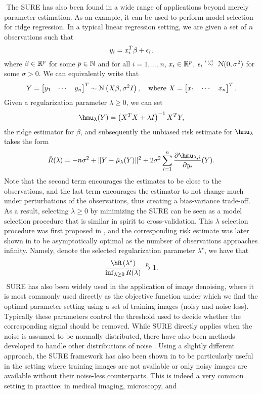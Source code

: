 $ $\newline
The SURE has also been found in a wide range of applications beyond merely parameter estimation. As an example, it can be used to perform model selection for ridge regression. In a typical linear regression setting, we are given a set of $n$ observations such that
\[
y_i = x_i^T\beta + \epsilon_i,
\]
where $\beta\in\mathbb{R}^p$ for some $p\in\mathbb{N}$ and for all $i=1,\dots,n$, $x_i\in\mathbb{R}^p$, $\epsilon_i\overset{\textrm{\tiny i.i.d.\ }}{\sim} \mathcal{N}(0,\sigma^2)$ for some $\sigma>0$. We can equivalently write that
\[
Y = \begin{bmatrix} y_1 & \cdots & y_n \end{bmatrix}^T \sim \mathcal{N}\left(X\beta, \sigma^2I \right), \quad \text{where } X = \begin{bmatrix} x_1 & \cdots & x_n \end{bmatrix}^T.
\]
Given a regularization parameter $\lambda\geq0$, we can set
\[
\hmu_\lambda(Y) = \left( X^TX + \lambda I \right)^{-1}X^TY,
\]
the ridge estimator for $\beta$, and subsequently the unbiased risk estimate for $\hmu_\lambda$ takes the form
\[
\hat{R}(\lambda) = -n\sigma^2 + \| Y - \hat{\mu}_\lambda(Y) \|^2 + 2\sigma^2\sum_{i=1}^n \frac{\partial \hmu_{\lambda,i}}{\partial y_i}(Y).
\]
Note that the second term encourages the estimates to be close to the observations, and the last term encourages the estimator to not change much under perturbations of the observations, thus creating a bias-variance trade-off. As a result, selecting $\lambda\geq0$ by minimizing the SURE can be seen as a model selection procedure that is similar in spirit to cross-validation. This $\lambda$ selection procedure was first proposed in \citet{10.2307/1267380}, and the corresponding risk estimate was later shown in \citet{li1986asymptotic} to be asymptotically optimal as the numbser of observations approaches infinity. Namely, denote the selected regularization parameter $\lambda^\star$, we have that
\[
\frac{\hR\left(\lambda^\star\right)}{\inf_{\lambda\geq0}R(\lambda)} \convp 1.
\]
$ $\newline
SURE has also been widely used in the application of image denoising, where it is most commonly used directly as the objective function under which we find the optimal parameter setting using a set of training images (noisy and noise-less). Typically these parameters control the threshold used to decide whether the corresponding signal should be removed. While SURE directly applies when the noise is assumed to be normally distributed, there have also been methods developed to handle other distributions of noise \citep{donoho1995adapting,luisier2010image,panisetti2014unbiased}. Using a slightly different approach, the SURE framework has also been shown in \citet{metzler2018unsupervised} to be particularly useful in the setting where training images are not available or only noisy images are available without their noise-less counterparts. This is indeed a very common setting in practice: in medical imaging, microscopy, and

